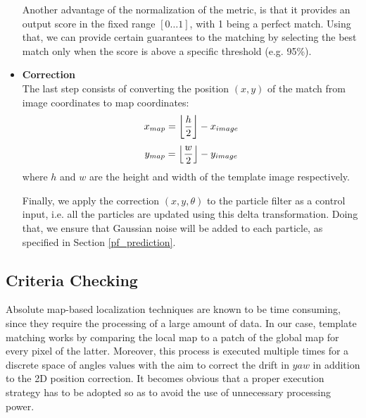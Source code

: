 \begin{itemize}
        Another advantage of the normalization of the metric, is that it
        provides an output score in the fixed range $[0 \dots 1]$, with
        1 being a perfect match. Using that, we can provide certain guarantees
        to the matching by selecting the best match only when the score is
        above a specific threshold (e.g. 95\%).


    \item \textbf{Correction} \\
        The last step consists of converting the position $(x, y)$ of the match
        from image coordinates to map coordinates:
        \begin{equation}
            x_{map} = \floor*{\frac{h}{2}} - x_{image}
        \end{equation}
        \begin{equation}
            y_{map} = \floor*{\frac{w}{2}} - y_{image}
        \end{equation}
        where $h$ and $w$ are the height and width of the template image
        respectively.

        Finally, we apply the correction $(x, y, \theta)$ to the particle
        filter as a control input, i.e. all the particles are updated using
        this delta transformation. Doing that, we ensure that Gaussian
        noise will be added to each particle, as specified in Section
        \ref{pf_prediction}.
\end{itemize}

\subsection{Criteria Checking} \label{pose_correction_criteria}

Absolute map-based localization techniques are known to be time consuming,
since they require the processing of a large amount of data.
In our case, template matching works by comparing the local map
to a patch of the global map for every pixel of the latter.
Moreover, this process is executed multiple times for a discrete space
of angles values with the aim to correct the drift in $yaw$ in addition to
the 2D position correction.
It becomes obvious that a proper execution strategy has to be
adopted so as to avoid the use of unnecessary processing power.

